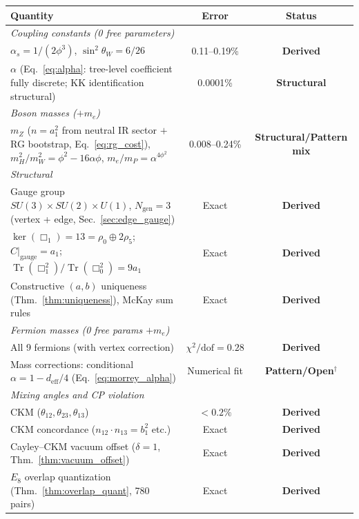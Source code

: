 \documentclass[12pt,a4paper]{article}
\theoremstyle{definition}
\begin{document}
\begin{table}[H]
\centering\footnotesize
\begin{tabular}{lcc}
\toprule
\textbf{Quantity} & \textbf{Error} & \textbf{Status} \\
\midrule
\multicolumn{3}{l}{\textit{Coupling constants (0 free parameters)}} \\
$\alpha_s = 1/(2\phi^3)$, $\sin^2\theta_W = 6/26$ & 0.11--0.19\% & \textbf{Derived} \\
$\alpha$ (Eq.~\ref{eq:alpha}: tree-level coefficient fully discrete; KK identification structural) & 0.0001\% & \textbf{Structural} \\
\midrule
\multicolumn{3}{l}{\textit{Boson masses ($+m_e$)}} \\
$m_Z$ ($n\!=\!a_1^2$ from neutral IR sector $+$ RG bootstrap, Eq.~\ref{eq:rg_cost}), $m_H^2/m_W^2 = \phi^2 - 16\alpha\phi$, $m_e/m_P = \alpha^{4\phi^2}$ & 0.008--0.24\% & \textbf{Structural/Pattern mix} \\
\midrule
\multicolumn{3}{l}{\textit{Structural}} \\
Gauge group $SU(3) \times SU(2) \times U(1)$, $N_{\text{gen}} = 3$ (vertex + edge, Sec.~\ref{sec:edge_gauge}) & Exact & \textbf{Derived} \\
$\ker(\Box_1) = 13 = \rho_0 \oplus 2\rho_5$; $C|_{\text{gauge}} = a_1$; $\operatorname{Tr}(\Box_1^2)/\operatorname{Tr}(\Box_0^2) = 9a_1$ & Exact & \textbf{Derived} \\
Constructive $(a,b)$ uniqueness (Thm.~\ref{thm:uniqueness}), McKay sum rules & Exact & \textbf{Derived} \\
\midrule
\multicolumn{3}{l}{\textit{Fermion masses (0 free params $+ m_e$)}} \\
All 9 fermions (with vertex correction) & $\chi^2/\text{dof} = 0.28$ & \textbf{Derived} \\
Mass corrections: conditional $\alpha=1-d_{\text{eff}}/4$ (Eq.~\ref{eq:morrey_alpha}) & Numerical fit & \textbf{Pattern/Open}$^\dagger$ \\
\midrule
\multicolumn{3}{l}{\textit{Mixing angles and CP violation}} \\
CKM ($\theta_{12}, \theta_{23}, \theta_{13}$) & $<0.2\%$ & \textbf{Derived} \\
CKM concordance ($n_{12}\!\cdot\! n_{13} = b_1^2$ etc.) & Exact & \textbf{Derived} \\
Cayley--CKM vacuum offset ($\delta = 1$, Thm.~\ref{thm:vacuum_offset}) & Exact & \textbf{Derived} \\
$E_8$ overlap quantization (Thm.~\ref{thm:overlap_quant}, 780 pairs) & Exact & \textbf{Derived} \\

\end{tabular}
\end{table}
\end{document}
